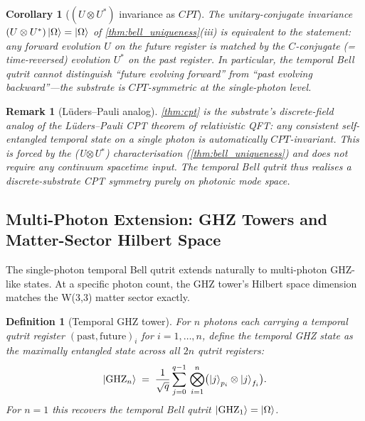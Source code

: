 ﻿\documentclass[12pt]{article}
\newtheorem{definition}[theorem]{Definition}
\newtheorem{corollary}[theorem]{Corollary}
\newtheorem{remark}[theorem]{Remark}
\begin{document}
\begin{corollary}[$(U\otimes U^*)$ invariance as $CPT$]\label{cor:uust_cpt}
The unitary-conjugate invariance $(U\otimes U^*)\ket{\Omega} = \ket{\Omega}$
of \cref{thm:bell_uniqueness}(iii) is equivalent to the statement:
\emph{any forward evolution $U$ on the future register is matched by the
$C$-conjugate (= time-reversed) evolution $U^*$ on the past register.}
In particular, the temporal Bell qutrit cannot distinguish
``future evolving forward'' from ``past evolving backward''---the
substrate is $CPT$-symmetric at the single-photon level.
\end{corollary}

\begin{remark}[Lüders--Pauli analog]
\cref{thm:cpt} is the substrate's discrete-field analog of the
Lüders--Pauli CPT theorem of relativistic QFT: any consistent
self-entangled temporal state on a single photon is automatically
$CPT$-invariant.  This is forced by the (U$\otimes$U$^*$) characterisation
(\cref{thm:bell_uniqueness}) and does not require any continuum spacetime
input.  The temporal Bell qutrit thus realises a \emph{discrete-substrate
CPT symmetry} purely on photonic mode space.
\end{remark}

\subsection{Multi-Photon Extension: GHZ Towers and Matter-Sector Hilbert Space}
\label{sec:ghz_tower}

The single-photon temporal Bell qutrit extends naturally to multi-photon
GHZ-like states.  At a specific photon count, the GHZ tower's Hilbert
space dimension matches the W(3,3) matter sector exactly.

\begin{definition}[Temporal GHZ tower]\label{def:ghz_tower}
For $n$ photons each carrying a temporal qutrit register
$(\text{past}, \text{future})_i$ for $i = 1,\ldots,n$, define the
\emph{temporal GHZ state} as the maximally entangled state across all $2n$
qutrit registers:
\begin{equation}
  \ket{\mathrm{GHZ}_n}
  \;=\; \frac{1}{\sqrt q}\sum_{j=0}^{q-1}\,
    \bigotimes_{i=1}^{n}\bigl(\ket{j}_{p_i}\otimes\ket{j}_{f_i}\bigr).
\end{equation}
For $n = 1$ this recovers the temporal Bell qutrit
$\ket{\mathrm{GHZ}_1} = \ket{\Omega}$.
\end{definition}
\end{document}
